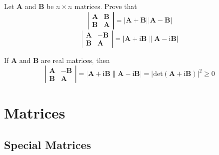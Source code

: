 \documentclass[12pt, a4paper, oneside]{book}
\begin{document}
\begin{theorem}
    Let $\mathbf{A}$ and $\mathbf{B}$ be $n \times n$ matrices. Prove that
    \[
        \left|
        \begin{matrix}
            \mathbf{A} & \mathbf{B} \\
            \mathbf{B} & \mathbf{A}
        \end{matrix}
        \right|
        =
        |\mathbf{A}+\mathbf{B}||\mathbf{A}-\mathbf{B}|
    \]
    \[
        \left|
        \begin{matrix}
            \mathbf{A} & -\mathbf{B} \\
            \mathbf{B} & \mathbf{A}
        \end{matrix}
        \right|
        =
        |\mathbf{A}+\mathrm{i} \mathbf{B} \| \mathbf{A}-\mathrm{i} \mathbf{B}|
    \]
\end{theorem}
\begin{corollary}
    If $\mathbf{A}$ and $\mathbf{B}$ are real matrices, then
    \[
        \left|
        \begin{matrix}
            \mathbf{A} & -\mathbf{B} \\
            \mathbf{B} & \mathbf{A}
        \end{matrix}
        \right|
        =
        |\mathbf{A}+\mathrm{i} \mathbf{B} \| \mathbf{A}-\mathrm{i} \mathbf{B}|
        =
        \left|\mathrm{det}(\mathbf{A}+\mathrm{i} \mathbf{B})\right|^2 \geq 0
    \]
\end{corollary}

\chapter{Matrices}
\section{Special Matrices}
\end{document}
